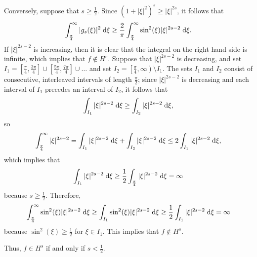 \documentclass{homework}
\begin{document}
	Conversely, suppose that $s \ge \frac{1}{2}$. Since $(1+|\xi|^2)^s \ge |\xi|^{2s}$, it follows that
	\begin{equation*}
		\int_\frac{\pi}{4}^\infty |g_s(\xi)|^2 \;\text{d}\xi \ge \frac{2}{\pi}\int_\frac{\pi}{4}^\infty \sin^2(\xi)|\xi|^{2s-2}\;\text{d} \xi.
	\end{equation*}
	If $|\xi|^{2s-2}$ is increasing, then it is clear that the integral on the right hand side is infinite, which implies that $f \notin H^s$. Suppose that $|\xi|^{2s-2}$ is decreasing, and set $I_1 = \left[\frac{\pi}{4}, \frac{3\pi}{4}\right] \cup \left[\frac{5\pi}{4}, \frac{7\pi}{4}\right] \cup \dots$ and set $I_2 = \left[\frac{\pi}{4}, \infty\right) \setminus I_1$. The sets $I_1$ and $I_2$ consist of consecutive, interleaved intervals of length $\frac{\pi}{2}$; since $|\xi|^{2s-2}$ is decreasing and each interval of $I_1$ precedes an interval of $I_2$, it follows that
	\begin{equation*}
		\int_{I_1} |\xi|^{2s-2}\;\text{d}\xi \ge \int_{I_2}|\xi|^{2s-2}\;\text{d}\xi,
	\end{equation*}
	so
	\begin{equation*}
		\int_\frac{\pi}{4}^\infty |\xi|^{2s-2} = \int_{I_1}|\xi|^{2s-2}\;\text{d}\xi + \int_{I_2}|\xi|^{2s-2}\;\text{d}\xi \le 2\int_{I_1} |\xi|^{2s-2}\;\text{d}\xi,
	\end{equation*}
	which implies that
	\begin{equation*}
		\int_{I_1}|\xi|^{2s-2}\;\text{d}\xi \ge \frac{1}{2}\int_{\frac{\pi}{4}} |\xi|^{2s-2}\;\text{d}\xi = \infty
	\end{equation*}
	because $s \ge \frac{1}{2}$. Therefore,
	\begin{equation*}
		\int_\frac{\pi}{4}^\infty \sin^2(\xi)|\xi|^{2s-2} \;\text{d}\xi \ge \int_{I_1}\sin^2(\xi)|\xi|^{2s-2}\;\text{d}\xi \ge \frac{1}{2}\int_{I_1}|\xi|^{2s-2}\;\text{d}\xi = \infty
	\end{equation*}
	because $\sin^2(\xi) \ge \frac{1}{2}$ for $\xi \in I_1$. This implies that $f \notin H^s$.
	
	Thus, $f\in H^s$ if and only if $s < \frac{1}{2}$.
		
	
	
\end{document}
